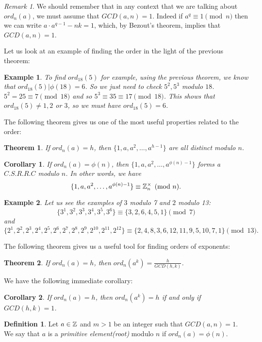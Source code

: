 \documentclass[12pt]{article}
\theoremstyle{plain}
\newtheorem{corollary}{Corollary}
\newtheorem{example}{Example}
\newtheorem{theorem}{Theorem}
\theoremstyle{definition}
\newtheorem{definition}{Definition}
\theoremstyle{remark}
\newtheorem{remark}{Remark}
\begin{document}
\begin{remark}
We should remember that in any context that we are talking about $ord_n(a)$, we must assume that $GCD(a,n)=1$. Indeed if $a^q\equiv 1 \pmod {n}$ then we can write $a\cdot a^{q-1}-nk=1$, which, by Bezout's theorem, implies that $GCD(a,n)=1$.
\end{remark}
Let us look at an example of finding the order in the light of the previous theorem:
\begin{example}
To find $ord_{18}(5)$ for example, using the previous theorem, we know that $ord_{18}(5)|\phi(18)=6$. So we just need to check $5^2, 5^3$ modulo $18$. $5^2=25 \equiv 7 \pmod{18}$ and so $5^3 \equiv 35 \equiv 17 \pmod{18}$. This shows that $ord_{18}(5)\neq 1, 2$ or $3$, so we must have $ord_{18}(5)=6$.
\end{example}

\bigskip
\noindent

The following theorem gives us one of the most useful properties related to the order:
\begin{theorem}
If $ord_n(a)=h$, then $\{1,a,a^2, \dots, a^{h-1}\}$ are all distinct modulo $n$.
\end{theorem}

\begin{corollary}
If $ord_n(a)=\phi(n)$, then $\{1,a, a^2, \dots, a^{\phi(n)-1}\}$ forms a $C.S.R.R.C$ modulo $n$. In other words, we have
$$\{1,a, a^2, \dots, a^{\phi(n)-1}\} \equiv \mathbb{Z}_n^{\times} \pmod{n}.$$
\end{corollary}
\begin{example}
Let us see the examples of $3$ modulo 7 and $2$ modulo 13:
$$\{3^1, 3^2, 3^3, 3^4, 3^5, 3^6\} \equiv \{3, 2, 6, 4, 5, 1\} \pmod{7}$$ and
$$\{2^1, 2^2, 2^3, 2^4, 2^5, 2^6, 2^7, 2^8, 2^9, 2^{10}, 2^{11}, 2^{12}\} \equiv \{2, 4, 8, 3, 6, 12, 11, 9, 5, 10, 7, 1\} \pmod{13}.$$
\end{example}

\bigskip
\noindent
The following theorem gives us a useful tool for finding orders of exponents:
\begin{theorem}
If $ord_n(a)=h$, then $ord_n(a^k) = \frac{h}{GCD(h,k)}$.
\end{theorem}

\bigskip
\noindent
We have the following immediate corollary:
\begin{corollary}
If $ord_{n}(a)=h$, then $ord_n(a^k)=h$ if and only if $GCD(h,k)=1$.
\end{corollary}

\bigskip
\noindent
\begin{definition}
Let $a\in \mathbb{Z}$ and $m>1$ be an integer such that $GCD(a,n)=1$. We say that $a$ is a {\it primitive element(root)} modulo $n$ if $ord_n(a)=\phi(n)$.
\end{definition}
\end{document}
